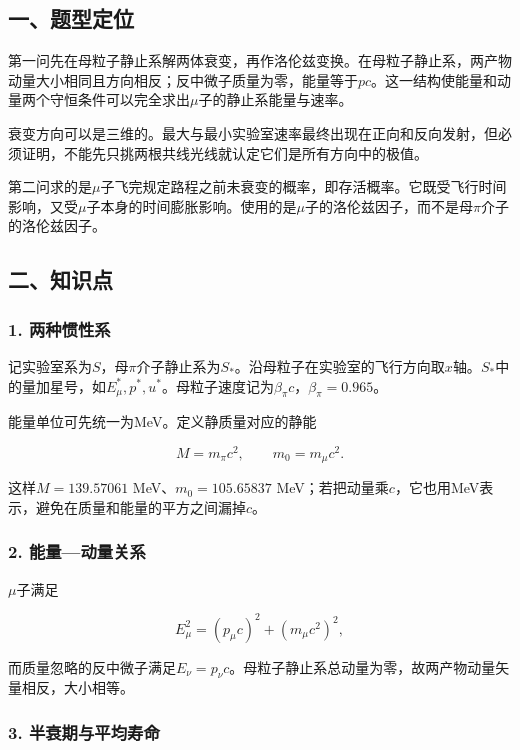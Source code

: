 \documentclass[12pt,a4paper,fontset=fandol]{ctexart}
\begin{document}
\subsection{一、题型定位}\label{ux4e00ux9898ux578bux5b9aux4f4d-5}

第一问先在母粒子静止系解两体衰变，再作洛伦兹变换。在母粒子静止系，两产物动量大小相同且方向相反；反中微子质量为零，能量等于\(pc\)。这一结构使能量和动量两个守恒条件可以完全求出\(\mu\)子的静止系能量与速率。

衰变方向可以是三维的。最大与最小实验室速率最终出现在正向和反向发射，但必须证明，不能先只挑两根共线光线就认定它们是所有方向中的极值。

第二问求的是\(\mu\)子飞完规定路程之前未衰变的概率，即存活概率。它既受飞行时间影响，又受\(\mu\)子本身的时间膨胀影响。使用的是\(\mu\)子的洛伦兹因子，而不是母\(\pi\)介子的洛伦兹因子。

\subsection{二、知识点}\label{ux4e8cux77e5ux8bc6ux70b9-5}

\subsubsection{1. 两种惯性系}\label{ux4e24ux79cdux60efux6027ux7cfb}

记实验室系为\(S\)，母\(\pi\)介子静止系为\(S_*\)。沿母粒子在实验室的飞行方向取\(x\)轴。\(S_*\)中的量加星号，如\(E_\mu^*,p^*,u^*\)。母粒子速度记为\(\beta_\pi c\)，\(\beta_\pi=0.965\)。

能量单位可先统一为MeV。定义静质量对应的静能

\[
M=m_\pi c^2,\qquad m_0=m_\mu c^2.
\]

这样\(M=139.57061\) MeV、\(m_0=105.65837\)
MeV；若把动量乘\(c\)，它也用MeV表示，避免在质量和能量的平方之间漏掉\(c\)。

\subsubsection{2.
能量---动量关系}\label{ux80fdux91cfux52a8ux91cfux5173ux7cfb}

\(\mu\)子满足

\[
E_\mu^2=(p_\mu c)^2+(m_\mu c^2)^2,
\]

而质量忽略的反中微子满足\(E_\nu=p_\nu c\)。母粒子静止系总动量为零，故两产物动量矢量相反，大小相等。

\subsubsection{3.
半衰期与平均寿命}\label{ux534aux8870ux671fux4e0eux5e73ux5747ux5bffux547d}
\end{document}
